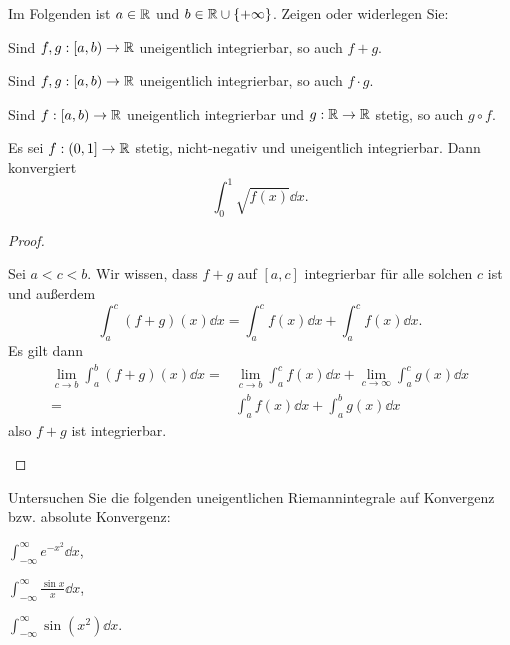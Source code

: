 \begin{Problem}
	Im Folgenden ist $a\in \mathbb{R}$ und $b\in \mathbb{R} \cup \left\{ +\infty \right\} $. Zeigen oder widerlegen Sie:
	\begin{parts}
		\item Sind $f,g:[a,b)\to \mathbb{R}$ uneigentlich integrierbar, so auch $f+g$.
		\item Sind $f,g:[a,b)\to \mathbb{R}$ uneigentlich integrierbar, so auch $f\cdot g$.
		\item Sind $f:[a,b)\to \mathbb{R}$ uneigentlich integrierbar und $g:\mathbb{R} \to \mathbb{R}$ stetig, so auch $g\circ f$.
		\item Es sei $f:(0,1]\to \mathbb{R}$ stetig, nicht-negativ und uneigentlich integrierbar. Dann konvergiert
			\[
				\int_0^1 \sqrt{f(x)} \dd{x}
			.\] 
	\end{parts}
\end{Problem}
\begin{proof}
	\begin{parts}
	\item Sei $a<c<b$. Wir wissen, dass $f+g$ auf $[a,c]$ integrierbar f\"{u}r alle solchen $c $ ist und außerdem
		\[
			\int_a^c (f+g)(x)\dd{x}=\int_a^c f(x)\dd{x}+\int_a^c f(x)\dd{x}
		.\] 
		Es gilt dann
		\begin{align*}
			\lim_{c \to b} \int_a^b (f+g)(x)\dd{x}=&\lim_{c \to b} \int_a^c f(x)\dd{x}+\lim_{c \to \infty} \int_a^c g(x)\dd{x}\\
			=&\int_a^b f(x)\dd{x}+\int_a^b g(x)\dd{x}
		\end{align*}
		also $f+g$ ist integrierbar.
	\end{parts}
\end{proof}
\begin{Problem}
Untersuchen Sie die folgenden uneigentlichen Riemannintegrale auf Konvergenz bzw. absolute Konvergenz:
\begin{parts}
\item $\int_{-\infty}^\infty e^{-x^2}\dd{x}$,
\item $\int_{-\infty}^\infty \frac{\sin x}{x}\dd{x}$,
\item $\int_{-\infty}^\infty \sin\left( x^2 \right) \dd{x}$.
\end{parts}
\end{Problem}

